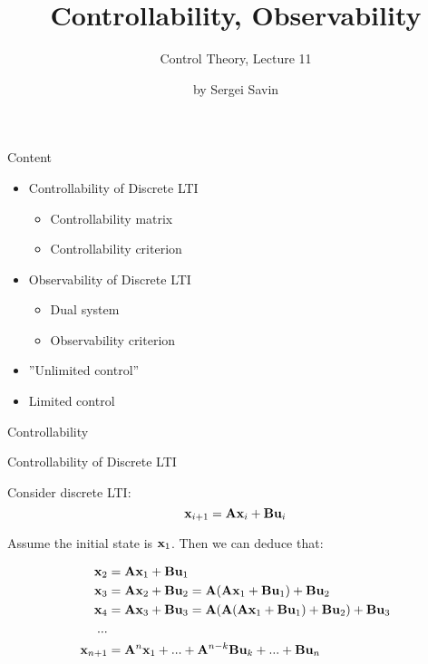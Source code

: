 \documentclass{beamer}
\title{Controllability, Observability}
\subtitle{Control Theory, Lecture 11}
\author{by Sergei Savin}
\date{\mydate}
\begin{document}
\maketitle


\begin{frame}{Content}
\begin{itemize}
\item Controllability of Discrete LTI
\begin{itemize}
    \item Controllability matrix
    \item Controllability criterion
\end{itemize}
\item Observability of Discrete LTI
\begin{itemize}
    \item Dual system
    \item Observability criterion
\end{itemize}
\item ”Unlimited control”
\item Limited control
\end{itemize}
\end{frame}



\begin{frame}{Controllability}
	\begin{flushleft}
		
		
		
	\end{flushleft}
\end{frame}


\begin{frame}{Controllability of Discrete LTI}
\begin{flushleft}

Consider discrete LTI:
\begin{equation}
\mathbf{x}_{i+1} = \mathbf{A}  \mathbf{x}_i + \mathbf{B} \mathbf{u}_i
\end{equation}

Assume the initial state is $\mathbf{x}_1$. Then we can deduce that:

\begin{align*}
\mathbf{x}_2 &= \mathbf{A} \mathbf{x}_1 + \mathbf{B} \mathbf{u}_1 \\
\mathbf{x}_3 &= \mathbf{A} \mathbf{x}_2 + \mathbf{B} \mathbf{u}_2 = \mathbf{A} (\mathbf{A} \mathbf{x}_1 + \mathbf{B} \mathbf{u}_1) + \mathbf{B} \mathbf{u}_2 \\
\mathbf{x}_4 &= \mathbf{A} \mathbf{x}_3 + \mathbf{B} \mathbf{u}_3 = \mathbf{A} (\mathbf{A} (\mathbf{A} \mathbf{x}_1 + \mathbf{B} \mathbf{u}_1) + \mathbf{B} \mathbf{u}_2) + \mathbf{B} \mathbf{u}_3 \\
... \\
\mathbf{x}_{n+1} &= \mathbf{A}^n \mathbf{x}_1 + ... + 
\mathbf{A}^{n - k} \mathbf{B} \mathbf{u}_{k} + ... + 
\mathbf{B} \mathbf{u}_n
\end{align*}

\end{flushleft}
\end{frame}
\end{document}
